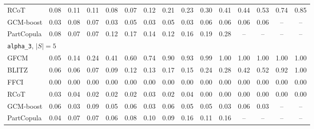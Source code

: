 \begin{longtable}{l*{14}{c}}
RCoT & 0.08 & 0.11 & 0.11 & 0.08 & 0.07 & 0.12 & 0.21 & 0.23 & 0.30 & 0.41 & 0.44 & 0.53 & 0.74 & 0.85 \\
GCM-boost & 0.03 & 0.08 & 0.07 & 0.03 & 0.05 & 0.03 & 0.05 & 0.03 & 0.06 & 0.06 & 0.06 & 0.06 & -- & -- \\
PartCopula & 0.08 & 0.07 & 0.07 & 0.12 & 0.17 & 0.14 & 0.12 & 0.16 & 0.19 & 0.28 & -- & -- & -- & -- \\
\midrule \multicolumn{15}{l}{\texttt{alpha\_3}, $|S|=5$}\\
GFCM & 0.05 & 0.14 & 0.24 & 0.41 & 0.60 & 0.74 & 0.90 & 0.93 & 0.99 & 1.00 & 1.00 & 1.00 & 1.00 & 1.00 \\
BLITZ & 0.06 & 0.06 & 0.07 & 0.09 & 0.12 & 0.13 & 0.17 & 0.15 & 0.24 & 0.28 & 0.42 & 0.52 & 0.92 & 1.00 \\
FFCI & 0.00 & 0.00 & 0.00 & 0.00 & 0.00 & 0.00 & 0.00 & 0.00 & 0.00 & 0.00 & 0.00 & 0.00 & 0.00 & 0.00 \\
RCoT & 0.03 & 0.04 & 0.02 & 0.02 & 0.02 & 0.03 & 0.02 & 0.04 & 0.00 & 0.00 & 0.00 & 0.00 & 0.00 & 0.00 \\
GCM-boost & 0.06 & 0.03 & 0.09 & 0.05 & 0.06 & 0.03 & 0.06 & 0.05 & 0.05 & 0.03 & 0.06 & 0.03 & -- & -- \\
PartCopula & 0.04 & 0.07 & 0.07 & 0.06 & 0.08 & 0.10 & 0.09 & 0.16 & 0.11 & 0.16 & -- & -- & -- & -- \\
\end{longtable}
\normalsize\setlength{\tabcolsep}{6pt}
